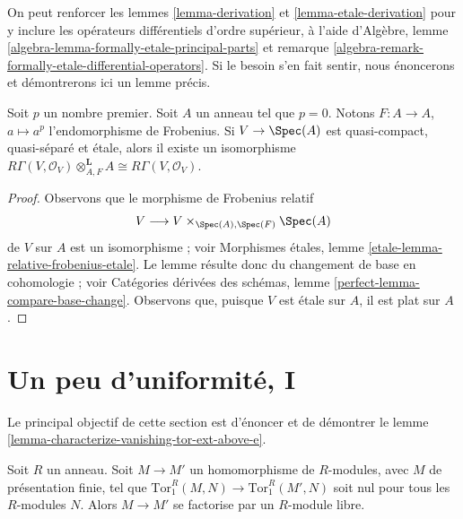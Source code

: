 \begin{remark}
\label{remark-higher-order-operators}
On peut renforcer les lemmes \ref{lemma-derivation} et \ref{lemma-etale-derivation} pour y inclure les opérateurs différentiels d'ordre supérieur, à l'aide d'Algèbre, lemme \ref{algebra-lemma-formally-etale-principal-parts} et remarque \ref{algebra-remark-formally-etale-differential-operators}. Si le besoin s'en fait sentir, nous énoncerons et démontrerons ici un lemme précis.
\end{remark}

\begin{lemma}
\label{lemma-etale-frobenius}
Soit $p$ un nombre premier. Soit $A$ un anneau tel que $p = 0$. Notons $F : A \to A$, $a \mapsto a^p$ l'endomorphisme de Frobenius. Si $V \to \Spec(A)$ est quasi-compact, quasi-séparé et \'etale, alors il existe un isomorphisme $R\Gamma(V, \mathcal{O}_V) \otimes_{A, F}^\mathbf{L} A \cong
R\Gamma(V, \mathcal{O}_V)$.
\end{lemma}

\begin{proof}
Observons que le morphisme de Frobenius relatif
$$
V \longrightarrow V \times_{\Spec(A), \Spec(F)} \Spec(A)
$$
de $V$ sur $A$ est un isomorphisme ; voir Morphismes \'etales, lemme \ref{etale-lemma-relative-frobenius-etale}. Le lemme résulte donc du changement de base en cohomologie ; voir Catégories dérivées des schémas, lemme \ref{perfect-lemma-compare-base-change}. Observons que, puisque $V$ est \'etale sur $A$, il est plat sur $A$.
\end{proof}





\section{Un peu d'uniformité, I}
\label{section-uniform-vanishing}

\noindent
Le principal objectif de cette section est d'énoncer et de démontrer le lemme \ref{lemma-characterize-vanishing-tor-ext-above-e}.

\begin{lemma}
\label{lemma-map-tor-1-zero}
Soit $R$ un anneau. Soit $M \to M'$ un homomorphisme de $R$-modules, avec $M$ de présentation finie, tel que $\text{Tor}_1^R(M, N) \to \text{Tor}_1^R(M', N)$ soit nul pour tous les $R$-modules $N$. Alors $M \to M'$ se factorise par un $R$-module libre.
\end{lemma}


